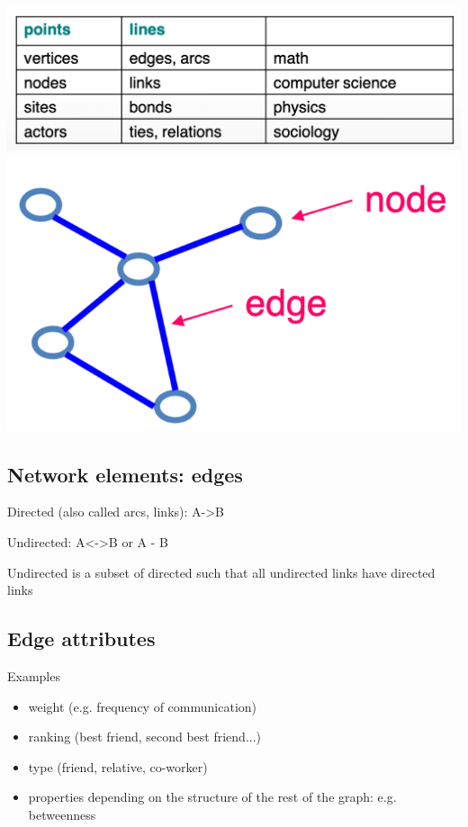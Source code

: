 \documentclass[11pt]{article}
\theoremstyle{definition}
\begin{document}
\includegraphics[width=\textwidth]{6.png}
\includegraphics[width=\textwidth/2]{7.png}

\subsection{Network elements: edges}
Directed (also called arcs, links): A->B

Undirected: A<->B or A - B

Undirected is a subset of directed such that all undirected links have directed links

\subsection{Edge attributes}
Examples

\begin{itemize}
    \item weight (e.g. frequency of communication)
    \item ranking (best friend, second best friend...)
    \item type (friend, relative, co-worker)
    \item properties depending on the structure of the rest
    of the graph: e.g. betweenness
\end{itemize}
\end{document}
